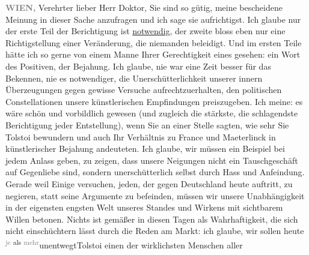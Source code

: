 \pstart
           \raggedleft{}\textcolor{gray}{\textbf{WIEN,}}\pend
           \vspace{0.5em}
\pstart
           Verehrter lieber Herr Doktor, Sie sind so gütig, meine bescheidene
               Meinung in dieser Sache anzufragen und ich sage sie aufrichtigst. Ich glaube nur der
               erste Teil der Berichtigung
               ist \uline{notwendig}, der zweite bloss eben nur eine
               Richtigstellung einer Veränderung, die niemanden beleidigt. Und im ersten Teile hätte
               ich so gerne von einem Manne Ihrer Gerechtigkeit eines gesehen: ein Wort des
               Positiven, der Bejahung. Ich glaube, nie war eine Zeit besser für das Bekennen, nie
               es notwendiger, die Unerschütterlichkeit unserer innern Überzeugungen gegen gewisse
               Versuche aufrechtzuerhalten, den {\pb}politischen Constellationen unsere künstlerischen Empfindungen preiszugeben. Ich
               meine: es wäre schön und vorbildlich gewesen (und zugleich die stärkste, die
               schlagendste Berichtigung jeder Entstellung), \strikeout{\textcolor{gray}{Sie}} wenn Sie an einer Stelle sagten, wie sehr Sie Tolstoi bewundern und auch Ihr Verhältnis zu France und Maeterlinck in künstlerischer Bejahung andeuteten. Ich glaube, wir müssen
               ein Beispiel bei jedem Anlass geben, zu zeigen, dass unsere Neigungen nicht ein
               Tauschgeschäft auf Gegenliebe sind, sondern unerschütterlich selbst durch Hass und
               Anfeindung. Gerade weil Einige versuchen, jeden, der gegen Deutschland heute
               auftritt, zu negieren, statt seine Argumente zu befeinden, müssen wir unsere
               Unabhängigkeit in der eigensten engsten Welt unseres Standes und Wirkens {\pb}mit sichtbarem Willen betonen. Nichts
               ist gemäßer in diesen Tagen als Wahrhaftigkeit, die sich nicht einschüchtern lässt
               durch die Reden am Markt: ich glaube, wir sollen heute \substVorne{}\textsuperscript{\textcolor{gray}{je} als \textcolor{gray}{mehr}}\substDazwischen{}unentwegt\substHinten{}{ }Tolstoi einen der wirklichsten Menschen aller
